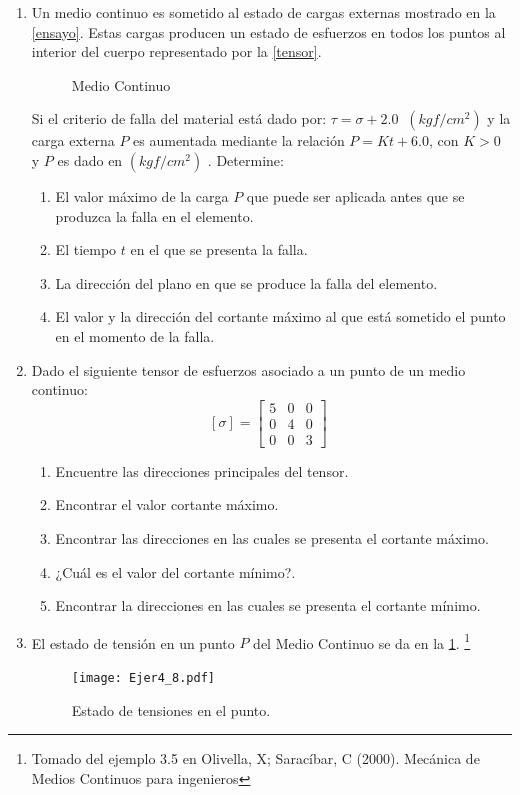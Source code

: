 \documentclass[../notas medios.tex]{subfiles}
\begin{document}
\begin{enumerate}
\item \label{punto23} Un medio continuo es sometido al estado de cargas externas  mostrado en la \cref{ensayo}. Estas cargas producen un estado de esfuerzos en todos los puntos  al interior del cuerpo  representado  por la \cref{tensor}. 
\begin{figure}[H]
	\centering
		\hspace{2.0cm}
	\caption{ Medio Continuo}
\end{figure}

Si el criterio de falla del material está dado por: $\tau = \sigma + 2.0 \;\; (kgf/cm^2)$ y  la carga externa $P$ es aumentada mediante la relación $P = Kt + 6.0$, con $K > 0$ y $P$ es dado en $ (kgf/cm^2)$   . Determine: 


\begin{enumerate}
\item El valor máximo de la carga  $P$ que puede ser aplicada antes que se produzca la  falla en el elemento.
\item El tiempo $t$ en el que se presenta la falla.
\item La  dirección del plano en que se produce la falla del elemento.  
\item El valor y la dirección del cortante máximo al que está sometido el punto en el momento de la falla. 
\end{enumerate}

\item \label{punto24} Dado el siguiente tensor de esfuerzos asociado a un punto
de un medio continuo:
\[ [\sigma] = \left[ \begin{array}{ccc}
	5 & 0 & 0 \\ 
	0 & 4 & 0 \\ 
	0 & 0 & 3
	\end{array}  \right] \enspace \]
	\begin{enumerate}
		\item Encuentre las direcciones principales del tensor.
		\item Encontrar el valor cortante máximo.
		\item Encontrar las direcciones en las cuales se presenta el cortante máximo.
		\item ¿Cuál es el valor del cortante mínimo?.
		\item Encontrar la direcciones en las cuales se presenta el cortante mínimo.
	\end{enumerate}
 \item \label{punto25} El estado de tensión en un punto $P$ del Medio Continuo
se da en la \cref{cubo}. \footnote{Tomado del ejemplo 3.5 en Olivella, X; Saracíbar, C (2000). Mecánica de Medios Continuos para ingenieros}\\
%
\begin{figure}[H]
	\centering
	\texttt{[image: Ejer4\_8.pdf]}
	\caption{Estado de tensiones en el punto.}
	\label{cubo}
\end{figure}


\end{enumerate}
\end{document}
